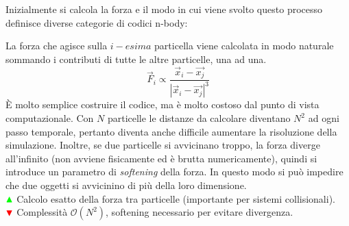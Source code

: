 Inizialmente si calcola la forza e il modo in cui viene svolto questo processo definisce diverse categorie di codici n-body:

\begin{example}
    La forza che agisce sulla $i-esima$ particella viene calcolata in modo naturale sommando i contributi di tutte le altre particelle, una ad una. $$ \vec{F}_i \propto \frac{\vec{x}_i-\vec{x_j}}{|\vec{x}_i-\vec{x_j}|^3}$$È molto semplice costruire il codice, ma è molto costoso dal punto di vista computazionale. Con $N$ particelle le distanze da calcolare diventano $N^2$ ad ogni passo temporale, pertanto diventa anche difficile aumentare la risoluzione della simulazione. Inoltre, se due particelle si avvicinano troppo, la forza diverge all'infinito (non avviene fisicamente ed è brutta numericamente), quindi si introduce un parametro di \textit{softening} della forza. In questo modo si può impedire che due oggetti si avvicinino di più della loro dimensione. 
    \\ ${\color{green} \blacktriangle  } $ Calcolo esatto della forza tra particelle (importante per sistemi collisionali). \\ ${\color{red} \blacktriangledown } $ Complessità $\mathcal{O} (N^2)$, softening necessario per evitare divergenza.
 
\end{example}   


